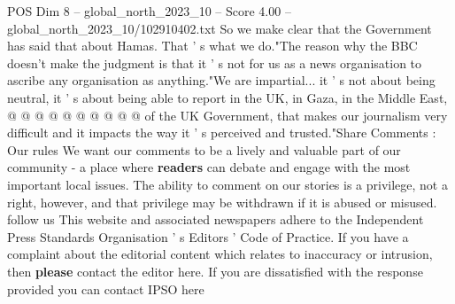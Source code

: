 \begin{textsample}{POS Dim 8 – global\_north\_2023\_10 – Score 4.00 – global\_north\_2023\_10/102910402.txt}
So we make clear that the Government has said that about Hamas.
That ' s what we do."The reason why the BBC doesn't make the judgment is that it ' s not for us as a news organisation to ascribe any organisation as anything."We are impartial... it ' s not about being neutral, it ' s about being able to report in the UK, in Gaza, in the Middle East, @ @ @ @ @ @ @ @ @ @ of the UK Government, that makes our journalism very difficult and it impacts the way it ' s perceived and trusted."Share Comments : Our rules We want our comments to be a lively and valuable part of our community - a place where \textbf{readers} can debate and engage with the most important local issues.
The ability to comment on our stories is a privilege, not a right, however, and that privilege may be withdrawn if it is abused or misused. follow us This website and associated newspapers adhere to the Independent Press Standards Organisation ' s Editors ' Code of Practice.
If you have a complaint about the editorial content which relates to inaccuracy or intrusion, then \textbf{please} contact the editor here.
If you are dissatisfied with the response provided you can contact IPSO here

\end{textsample}
